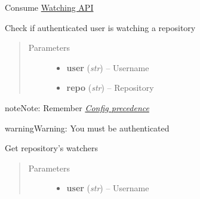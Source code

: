 \documentclass[letterpaper,10pt,english]{sphinxmanual}
\begin{document}
\begin{fulllineitems}
\label{repos:pygithub3.services.repos.Watchers}
Consume \href{http://developer.github.com/v3/repos/watching}{Watching API}

\begin{fulllineitems}
\label{repos:pygithub3.services.repos.Watchers.is_watching}
Check if authenticated user is watching a repository
\begin{quote}\begin{description}
\item[{Parameters}] \leavevmode\begin{itemize}
\item {} 
\textbf{user} (\emph{str}) -- Username

\item {} 
\textbf{repo} (\emph{str}) -- Repository

\end{itemize}

\end{description}\end{quote}

\begin{notice}{note}{Note:}
Remember {\hyperref[repos:config-precedence]{\emph{Config precedence}}}
\end{notice}

\begin{notice}{warning}{Warning:}
You must be authenticated
\end{notice}

\end{fulllineitems}


\begin{fulllineitems}
\label{repos:pygithub3.services.repos.Watchers.list}
Get repository's watchers
\begin{quote}\begin{description}
\item[{Parameters}] \leavevmode\begin{itemize}
\item {} 
\textbf{user} (\emph{str}) -- Username


\end{itemize}
\end{description}
\end{quote}
\end{fulllineitems}
\end{fulllineitems}
\end{document}
